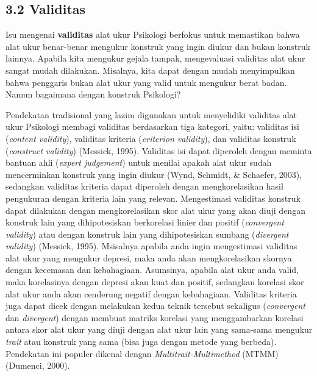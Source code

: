 \documentclass[
  english,
  man]{apa6}
\begin{document}
\hypertarget{validitas}{%
\subsection{3.2 Validitas}\label{validitas}}

Isu mengenai \textbf{validitas} alat ukur Psikologi berfokus untuk memastikan bahwa alat ukur benar-benar mengukur konstruk yang ingin diukur dan bukan konstruk lainnya. Apabila kita mengukur gejala tampak, mengevaluasi validitas alat ukur sangat mudah dilakukan. Misalnya, kita dapat dengan mudah menyimpulkan bahwa penggaris bukan alat ukur yang valid untuk mengukur berat badan. Namun bagaimana dengan konstruk Psikologi?

Pendekatan tradisional yang lazim digunakan untuk menyelidiki validitas alat ukur Psikologi membagi validitas berdasarkan tiga kategori, yaitu: validitas isi (\emph{content validity}), validitas kriteria (\emph{criterion validity}), dan validitas konstruk (\emph{construct validity}) (Messick, 1995). Validitas isi dapat diperoleh dengan meminta bantuan ahli (\emph{expert judgement}) untuk menilai apakah alat ukur sudah mencerminkan konstruk yang ingin diukur (Wynd, Schmidt, \& Schaefer, 2003), sedangkan validitas kriteria dapat diperoleh dengan mengkorelasikan hasil pengukuran dengan kriteria lain yang relevan. Mengestimasi validitas konstruk dapat dilakukan dengan mengkorelasikan skor alat ukur yang akan diuji dengan konstruk lain yang dihipotesiskan berkorelasi linier dan positif (\emph{convergent validity}) atau dengan konstruk lain yang dihipotesiskan sumbang (\emph{divergent validity}) (Messick, 1995). Msisalnya apabila anda ingin mengestimasi validitas alat ukur yang mengukur depresi, maka anda akan mengkorelasikan skornya dengan kecemasan dan kebahagiaan. Asumsinya, apabila alat ukur anda valid, maka korelasinya dengan depresi akan kuat dan positif, sedangkan korelasi skor alat ukur anda akan cenderung negatif dengan kebahagiaan. Validitas kriteria juga dapat dicek dengan melakukan kedua teknik tersebut sekaligus (\emph{convergent} dan \emph{divergent}) dengan membuat matriks korelasi yang menggambarkan korelasi antara skor alat ukur yang diuji dengan alat ukur lain yang sama-sama mengukur \emph{trait} atau konstruk yang sama (bisa juga dengan metode yang berbeda). Pendekatan ini populer dikenal dengan \emph{Multitrait-Multimethod} (MTMM) (Dumenci, 2000).
\end{document}
